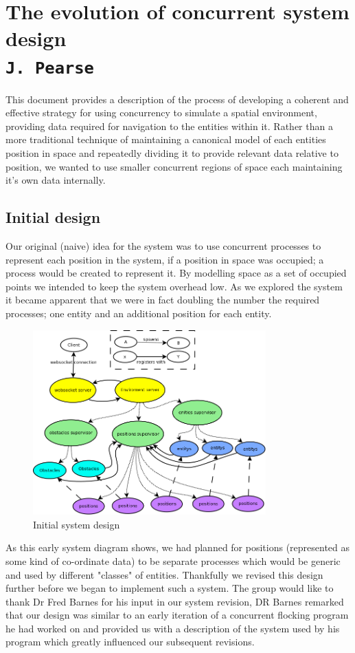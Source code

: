 \pagestyle{empty}

\section{The evolution of concurrent system design\\{\small\tt{J.~Pearse}}}
This document provides a description of the process of developing a coherent and effective strategy for using concurrency to simulate a spatial environment, providing data required for navigation to the entities within it.
Rather than a more traditional technique of maintaining a canonical model of each entities position in space and repeatedly dividing it to provide relevant data relative to position, we wanted to use smaller concurrent regions of space each maintaining it's own data internally.
\subsection{Initial design}
Our original (naive) idea for the system was to use concurrent processes to represent each position in the system, if a position in space was occupied; a process would be created to represent it. By modelling space as a set of occupied points we intended to keep the system overhead low. As we explored the system it became apparent that we were in fact doubling the number the required processes; one entity and an additional position for each entity.
\begin{figure}[h]
  \centering
  \includegraphics[width=0.8\textwidth]{img/HighLevelProcess.png}
\caption{Initial system design}
    \label{fig:Initial system design}
\end{figure}
As this early system diagram shows, we had planned for positions (represented as some kind of co-ordinate data) to be separate processes which would be generic and used by different "classes" of entities. Thankfully we revised this design further before we began to implement such a system.
The group would like to thank Dr Fred Barnes for his input in our system revision, DR Barnes remarked that our design was similar to an early iteration of a concurrent flocking program he had worked on and provided us with a description of the system used by his program which greatly influenced our subsequent revisions.

